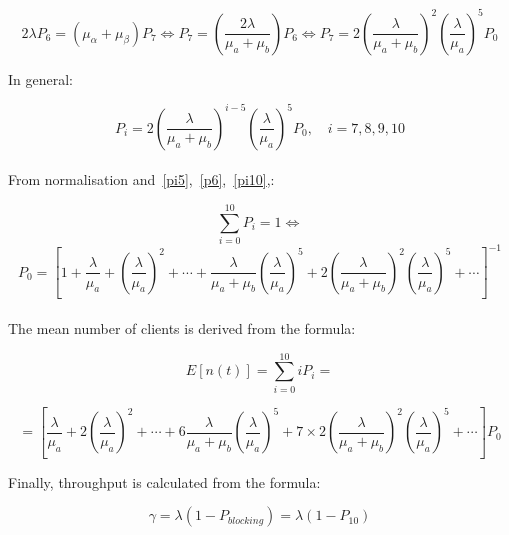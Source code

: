 \documentclass[a4paper, 11pt]{article}
\begin{document}
\begin{displaymath}
  2\lambda P_6 = (\mu_\alpha + \mu_\beta)P_7 \Leftrightarrow
  P_7 = {\left(\frac{2\lambda}{\mu_a + \mu_b}\right)P_6} \Leftrightarrow
  P_7 = 2{\left(\frac{\lambda}{\mu_a + \mu_b}\right)}^2 {\left(\frac{\lambda}{\mu_a}\right)}^5P_0
\end{displaymath}

In general:

\begin{equation}\label{pi10}
  P_i = 2 {\left(\frac{\lambda}{\mu_a + \mu_b}\right)}^{i-5}
  {\left(\frac{\lambda}{\mu_a}\right)}^5 P_0,\quad i = 7, 8, 9, 10
\end{equation}

\paragraph{} From normalisation and~\ref{pi5},~\ref{p6},~\ref{pi10},:

\begin{displaymath}
  \sum_{i=0}^{10} P_i = 1 \Leftrightarrow
\end{displaymath}
\begin{displaymath}
  P_0 = {\left[
  1 + \frac{\lambda}{\mu_a} + {\left(\frac{\lambda}{\mu_a}\right)}^2 +
  \cdots +
  \frac{\lambda}{\mu_a + \mu_b}{\left(\frac{\lambda}{\mu_a}\right)}^5 +
  2{\left(\frac{\lambda}{\mu_a + \mu_b}\right)}^2 {\left(\frac{\lambda}{\mu_a}\right)}^5 +
  \cdots
  \right]}^{-1}
\end{displaymath}

\paragraph{} The mean number of clients is derived from the formula:

\begin{displaymath}
  E[n(t)] = \sum_{i=0}^{10} iP_i =
\end{displaymath}

\begin{displaymath}
  = {\left[
      \frac{\lambda}{\mu_a} +
      2 {\left(\frac{\lambda}{\mu_a}\right)}^2 +
      \cdots +
      6 \frac{\lambda}{\mu_a + \mu_b} {\left(\frac{\lambda}{\mu_a}\right)}^5 +
      7 \times 2 {\left(\frac{\lambda}{\mu_a + \mu_b}\right)}^2 {\left(\frac{\lambda}{\mu_a}\right)}^5 +
      \cdots
  \right]} P_0
\end{displaymath}

Finally, throughput is calculated from the formula:

\begin{displaymath}
  \gamma = \lambda(1 - P_{blocking}) = \lambda(1 - P_{10})
\end{displaymath}
\end{document}
